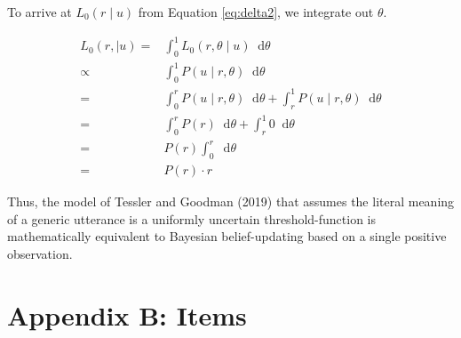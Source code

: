 \documentclass[floatsintext,doc]{apa6}
\begin{document}
\noindent To arrive at \(L_0(r \mid u)\) from Equation \ref{eq:delta2}, we integrate out \(\theta\).

\begin{align}
L_0(r, \mid u) =& \int_{0}^{1} L_0(r, \theta \mid u) \mathop{}\!\mathrm{d}\theta \nonumber \\
\propto& \int_{0}^{1} P(u \mid r, \theta)  \mathop{}\!\mathrm{d}\theta \nonumber \\
=& \int_{0}^{r} P(u \mid r, \theta) \mathop{}\!\mathrm{d}\theta + \int_{r}^{1}P(u \mid r, \theta) \mathop{}\!\mathrm{d}\theta \nonumber \\
=& \int_{0}^{r} P(r) \mathop{}\!\mathrm{d}\theta + \int_{r}^{1} 0 \mathop{}\!\mathrm{d}\theta \nonumber  \\ 
   = &  P(r) \int_{0}^{r} \mathop{}\!\mathrm{d}\theta \nonumber \\
     = &   P(r) \cdot r \label{eq:L0d}
\end{align}

Thus, the model of Tessler and Goodman (2019) that assumes the literal meaning of a generic utterance is a uniformly uncertain threshold-function is mathematically equivalent to Bayesian belief-updating based on a single positive observation. 

\newpage
\hypertarget{appendix-items}{%
\section{Appendix B: Items}\label{appendix-items}}
\end{document}
